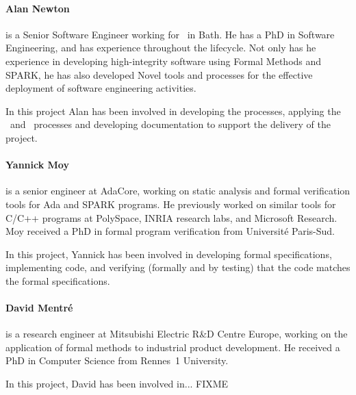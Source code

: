 \paragraph{Alan Newton}\label{AlanNewton} is a Senior Software Engineer
working for \altran\ in Bath. He has a PhD in Software Engineering,
and has experience throughout the lifecycle. Not only has he
experience in developing high-integrity software using Formal Methods
and SPARK, he has also developed Novel tools and processes for the
effective deployment of software engineering activities.

In this project Alan has been involved in developing the processes,
applying the \reveal\ and \informed\ processes and developing
documentation to support the delivery of the project.

\paragraph{Yannick Moy}\label{YannickMoy}
is a senior engineer at AdaCore, working on static
analysis and formal verification tools for Ada and SPARK programs. He
previously worked on similar tools for C/C++ programs at PolySpace,
INRIA research labs, and Microsoft Research. Moy received a PhD in
formal program verification from Universit\'e Paris-Sud.

In this project, Yannick has been involved in developing formal
specifications, implementing code, and verifying (formally and by testing)
that the code matches the formal specifications.

\paragraph{David Mentr\' e}\label{DavidMentre} is a research engineer at
Mitsubishi Electric R\&D Centre Europe, working on the application of
formal methods to industrial product development. He received a PhD in
Computer Science from Rennes~1 University.

In this project, David has been involved in... FIXME
